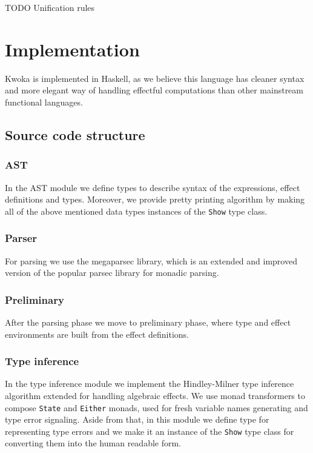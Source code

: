 \documentclass[a4paper]{article}
\begin{document}
\begin{center}
  \large TODO Unification rules
\end{center}

\vspace{2cm}

\section{Implementation}
Kwoka is implemented in Haskell, as we believe this language has cleaner syntax and
more elegant way of handling effectful computations than other mainstream functional languages.
\subsection*{Source code structure}

\subsubsection*{AST}
In the AST module we define types to describe syntax of the expressions,
effect definitions and types. Moreover, we provide pretty printing algorithm
by making all of the above mentioned data types instances of the \verb+Show+ type class.

\subsubsection*{Parser}
For parsing we use the megaparsec library,
which is an extended and improved version of the popular parsec library for monadic parsing.

\subsubsection*{Preliminary}
After the parsing phase we move to preliminary phase, where type and effect environments
are built from the effect definitions.

\subsubsection*{Type inference}
In the type inference module we implement the Hindley-Milner type inference algorithm extended
for handling algebraic effects. We use monad transformers to compose \verb+State+ and \verb+Either+
monads, used for fresh variable names generating and type error signaling. Aside from that, in this
module we define type for representing type errors and we make it an instance of the \verb+Show+
type class for converting them into the human readable form.
\end{document}
